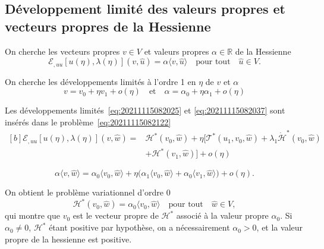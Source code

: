 \documentclass[12pt, final]{amsart}
\newcommand{\reals}{\mathbb{R}}
\begin{document}
\subsection{Développement limité des valeurs propres et vecteurs propres de la Hessienne}

On cherche les vecteurs propres \(v\in V\) et valeurs propres
\(\alpha\in\reals\) de la Hessienne
\begin{equation}
  \label{eq:20211115082122}
  \mathcal E_{,uu}[u(\eta), \lambda(\eta)](v, \hat{u})
  =\alpha\langle v, \hat{u}\rangle
  \quad\text{pour tout}\quad\hat{u}\in V.
\end{equation}

On cherche les développements limités à l'ordre 1 en \(\eta\) de \(v\) et \(\alpha\)
\begin{equation}
  \label{eq:20211115082037}
  v = v_0+\eta v_1+o(\eta)
  \quad\text{et}\quad
  \alpha=\alpha_0+\eta\alpha_1+o(\eta)
\end{equation}

Les développements limités~\eqref{eq:20211115082025} et
\eqref{eq:20211115082037} sont insérés dans le
problème~\eqref{eq:20211115082122}
\begin{equation}
  \begin{aligned}[b]
    \mathcal E_{,uu}[u(\eta), \lambda(\eta)](v, \hat{w})={}
    &\mathcal H^\ast(v_0, \hat{w})
    +\eta\bigl[\mathcal T^\ast(u_1, v_0, \hat{w})
    +\lambda_1\dot{\mathcal H}^\ast(v_0, \hat{w})\\
    &+\mathcal H^\ast(v_1, \hat{w})\bigr]+o(\eta)
  \end{aligned}
\end{equation}

\begin{equation}
  \alpha\langle v, \hat{w}\rangle=\alpha_0\langle v_0, \hat{w}\rangle
  +\eta\bigl(\alpha_1\langle v_0, \hat{w}\rangle+\alpha_0\langle v_1, \hat{w}\rangle\bigr)
  +o(\eta).
\end{equation}

On obtient le problème variationnel d'ordre 0
\begin{equation}
  \mathcal H^\ast(v_0, \hat{w})=\alpha_0\langle v_0, \hat{w}\rangle
  \quad\text{pour tout}\quad\hat{w}\in V,
\end{equation}
qui montre que \(v_0\) est le vecteur propre de \(\mathcal H^\ast\) associé à
la valeur propre \(\alpha_0\). Si \(\alpha_0\neq 0\), \(\mathcal H^\ast\) étant
positive par hypothèse, on a nécessairement \(\alpha_0>0\), et la valeur propre
de la hessienne est positive.
\end{document}
